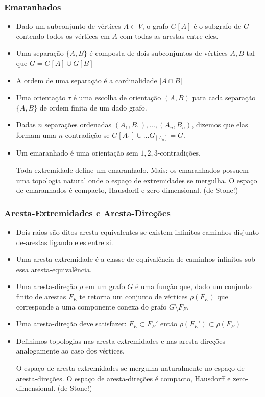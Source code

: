 \begin{frame}{}
\frametitle{Emaranhados}
    \begin{itemize}
        \item Dado um subconjunto de vértices $A \subset V$, o grafo $G[A]$ é o subgrafo de $G$ contendo todos os vértices em $A$ com todas as arestas entre eles.\pause
        \item Uma separação $\{A,B\}$ é composta de dois subconjuntos de vértices $A,B$ tal que $G = G[A] \cup G[B]$ \pause
        \item A ordem de uma separação é a cardinalidade $|A \cap B|$ \pause
        \item Uma orientação $\tau$ é uma escolha de orientação $(A,B)$ para cada separação $\{A,B\}$ de ordem finita de um dado grafo. \pause
        \item Dadas $n$ separações ordenadas $(A_1,B_1),\dots, (A_n, B_n)$, dizemos que elas formam uma $n$-contradição se $G[A_1] \cup \dots G_[A_n] = G$. \pause
        \item Um emaranhado é uma orientação sem $1,2,3$-contradições.\pause
        \begin{theorem}[Diestel, 2017]
        Toda extremidade define um emaranhado. Mais: os emaranhados possuem uma topologia natural onde o espaço de extremidades se mergulha. O espaço de emaranhados é compacto, Hausdorff e zero-dimensional. (de Stone!)
         \end{theorem}

        \end{itemize}
\end{frame}

\begin{frame}{}
\frametitle{Aresta-Extremidades e Aresta-Direções}
    \begin{itemize}
        \item Dois raios são ditos aresta-equivalentes se existem infinitos caminhos disjunto-de-arestas ligando eles entre si. \pause
        \item Uma aresta-extremidade é a classe de equivalência de caminhos infinitos sob essa aresta-equivalência.\pause
        \item Uma aresta-direção $\rho$ em um grafo $G$ é uma função que, dado um conjunto finito de arestas $F_E$ te retorna um conjunto de vértices $\rho(F_E)$ que corresponde a uma componente conexa do grafo $G \setminus F_E$. \pause
        \item Uma aresta-direção deve satisfazer:  $F_E \subset F_{E}'$ então $\rho(F_{E}') \subset \rho(F_E)$ \pause
        \item Definimos topologias nas aresta-extremidades e nas aresta-direções analogamente ao caso dos vértices.
        \begin{theorem}
            O espaço de aresta-extremidades se mergulha naturalmente no espaço de aresta-direções. O espaço de aresta-direções é compacto, Hausdorff e zero-dimensional. (de Stone!)
        \end{theorem}
        \end{itemize}
\end{frame}

